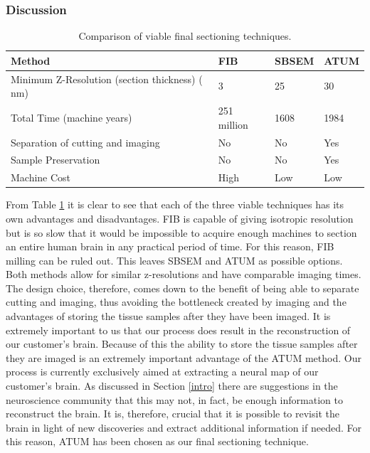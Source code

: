 \documentclass[a4paper, 11pt]{article}
\numberwithin{equation}{section}
\begin{document}
	\subsubsection{Discussion}
	\begin{table}[h]
		\centering
		\caption{Comparison of viable final sectioning techniques.}
		\label{finalsectioning_table}
		\begin{tabular}{|l|l|l|l|}
			\hline
			\textbf{Method}            & \textbf{FIB} & \textbf{SBSEM} & \textbf{ATUM} \\ \hline
			Minimum Z-Resolution (section thickness) ( nm)  & 3            & 25             & 30            \\ \hline
			Total Time (machine years) & 251 million  & 1608           & 1984          \\ \hline
			Separation of cutting and imaging                 & No           & No             & Yes           \\ \hline
			Sample Preservation        & No           & No             & Yes           \\ \hline
			Machine Cost               & High         & Low            & Low           \\ \hline
		\end{tabular}
	\end{table}
	
	From Table \ref{finalsectioning_table} it is clear to see that each of the three viable techniques has its own advantages and disadvantages. FIB is capable of giving isotropic resolution but is so slow that it would be impossible to acquire enough machines to section an entire human brain in any practical period of time. For this reason, FIB milling can be ruled out. This leaves SBSEM and ATUM as possible options. Both methods allow for similar z-resolutions and have comparable imaging times. The design choice, therefore, comes down to the benefit of being able to separate cutting and imaging, thus avoiding the bottleneck created by imaging and the advantages of storing the tissue samples after they have been imaged. It is extremely important to us that our process does result in the reconstruction of our customer's brain. Because of this the ability to store the tissue samples after they are imaged is an extremely important advantage of the ATUM method. Our process is currently exclusively aimed at extracting a neural map of our customer's brain. As discussed in Section \ref{intro} there are suggestions in the neuroscience community that this may not, in fact, be enough information to reconstruct the brain. It is, therefore, crucial that it is possible to revisit the brain in light of new discoveries and extract additional information if needed. For this reason, ATUM has been chosen as our final sectioning technique.
	\pagestyle{judah}
\end{document}
